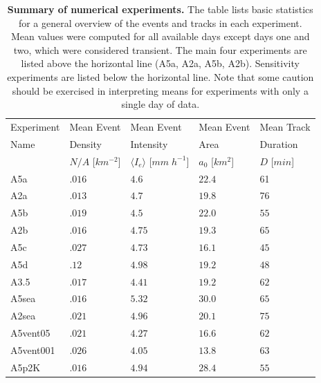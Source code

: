 \documentclass[draft,linenumbers]{agujournal2019}
\begin{document}
\begin{table}[b]
\centering
\begin{tabular}{lllll}
    Experiment & Mean Event & Mean Event & Mean Event & Mean Track\\
    Name & Density & Intensity & Area & Duration\\
     & $N/A$ [$km^{-2}$] & $\langle I_e\rangle$ [$mm\;h^{-1}$] & $a_0$ [$km^2$] & $D$ [$min$]\\
    \hline
    A5a & $.016$ & $4.6$ & $22.4$ & 61 \\
    A2a & $.013$ & $4.7$ & $19.8$ & 76\\
    A5b & $.019$ & $4.5$ & $22.0$ & $55$\\
    A2b & $.016$ & $4.75$ & $19.3$ & $65$\\
    \hline
    A5c & $.027$ & $4.73$ & $16.1$ & $45$\\
    A5d & $.12$ & $4.98$ & $19.2$ & $48$\\
    A3.5 & $.017$ & $4.41$ & $19.2$ & $62$\\
    A5sea & $.016$ & $5.32$ & $30.0$ & $65$\\
    A2sea & $.021$ & $4.96$ & $20.1$ & $75$\\
    A5vent05 & $.021$ & $4.27$ & $16.6$ & $62$\\
    A5vent001 & $.026$ & $4.05$ & $13.8$ & $63$\\
    A5p2K & $.016$ & $4.94$ & $28.4$ & $55$\\
    \hline
\end{tabular}
\caption{{\bf Summary of numerical experiments.}
The table lists basic statistics for a general overview of the events and tracks in each experiment. 
Mean values were computed for all available days except days one and two, which were considered transient. 
The main four experiments are listed above the horizontal line (A5a, A2a, A5b, A2b). 
Sensitivity experiments are listed below the horizontal line. 
Note that some caution should be exercised in interpreting means for experiments with only a single day of data.
}
\label{tab:basic_stats}
\end{table}
\end{document}
